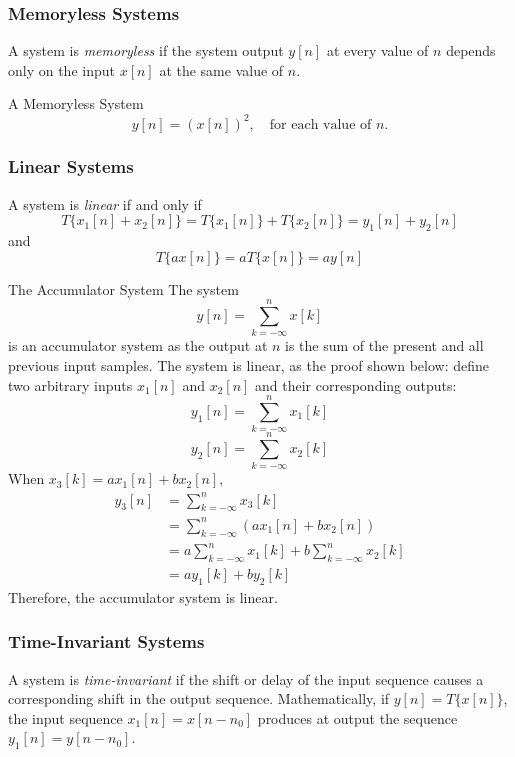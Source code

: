 \subsubsection{Memoryless Systems}
A system is \textit{memoryless} if the system output $y[n]$ at every value of $n$ depends only on the input $x[n]$ at the same value of $n$.
\begin{ex}{A Memoryless System}
    \[
        y[n] = (x[n])^2, \quad \text{for each value of $n$.}
    \]
\end{ex}
\subsubsection{Linear Systems}
A system is \textit{linear} if and only if
\[
    T\{ x_{1}[n] + x_{2}[n] \} 
    =  T\{ x_{1}[n] \} + T\{ x_{2}[n] \}
    = y_{1}[n] + y_{2}[n]
\]
and
\[
     T\{ ax[n] \} = a T\{ x[n] \} = ay[n]
\]

\begin{ex}{The Accumulator System}
The system
    \[
        y[n] = \sum_{k=-\infty}^{n}x[k]
    \]
is an accumulator system as the output at $n$ is the sum of the present and all previous input samples. The system is linear, as the proof shown below: define two arbitrary inputs $x_{1}[n]$ and $x_{2}[n]$ and their corresponding outputs:
\[
    y_{1}[n] = \sum_{k=-\infty}^{n}x_{1}[k]
\]
\[
    y_{2}[n] = \sum_{k=-\infty}^{n}x_{2}[k]
\]
When $x_{3}[k] = ax_{1}[n] + bx_{2}[n]$, 
\begin{align*}
    y_{3}[n]
    & = \sum_{k=-\infty}^{n}x_{3}[k] \\
    & = \sum_{k=-\infty}^{n} (ax_{1}[n] + bx_{2}[n]) \\
    & = a \sum_{k=-\infty}^{n} x_{1}[k] + b \sum_{k=-\infty}^{n} x_{2}[k] \\
    & = ay_{1}[k] + by_{2}[k]
\end{align*}
Therefore, the accumulator system is linear.
\end{ex}
\subsubsection{Time-Invariant Systems}
A system is \textit{time-invariant} if the shift or delay of the input sequence causes a corresponding shift in the output sequence. Mathematically, if $y[n] = T\{x[n]\}$, the input sequence $x_{1}[n]=x[n-n_0]$ produces at output the sequence $y_{1}[n]=y[n-n_0]$. 

